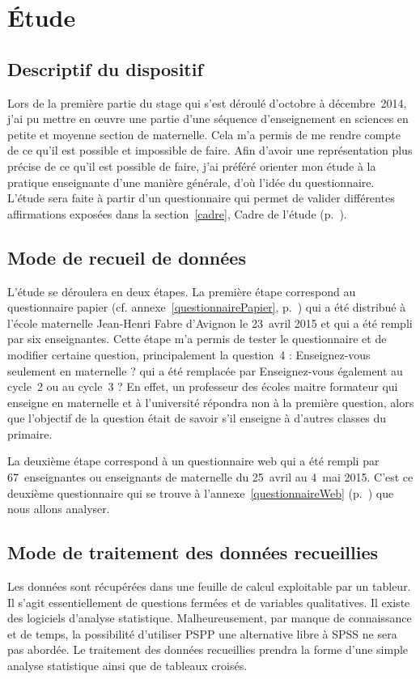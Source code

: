 \chapter{Étude}
\section{Descriptif du dispositif}
Lors de la première partie du stage qui s’est déroulé d’octobre à décembre~2014, j’ai pu mettre en œuvre une partie d’une séquence d’enseignement en sciences en petite et moyenne section de maternelle. Cela m’a permis de me rendre compte de ce qu’il est possible et impossible de faire. Afin d’avoir une représentation plus précise de ce qu’il est possible de faire, j’ai préféré orienter mon étude à la pratique enseignante d’une manière générale, d’où l’idée du questionnaire. L’étude sera faite à partir d’un questionnaire qui permet de valider différentes affirmations exposées dans la section~\ref{cadre}, \og Cadre de l’étude \fg{} (p.~\pageref{cadre}).

\section{Mode de recueil de données}
L’étude se déroulera en deux étapes. La première étape correspond au questionnaire papier (cf. annexe~\ref{questionnairePapier}, p.~\pageref{questionnairePapier}) qui a été distribué à l’école maternelle Jean-Henri Fabre d’Avignon le 23~avril 2015 et qui a été rempli par six enseignantes. Cette étape m’a permis de tester le questionnaire et de modifier certaine question, principalement la question~4 : \og Enseignez-vous seulement en maternelle ? \fg{} qui a été remplacée par \og Enseignez-vous également au cycle~2 ou au cycle~3 ? \fg{} En effet, un professeur des écoles maitre formateur qui enseigne en maternelle et à l’université répondra \og non \fg{} à la première question, alors que l’objectif de la question était de savoir s’il enseigne à d’autres classes du primaire.

La deuxième étape correspond à un questionnaire web qui a été rempli par 67~enseignantes ou enseignants de maternelle du 25~avril au 4~mai 2015. C’est ce deuxième questionnaire qui se trouve à l’annexe~\ref{questionnaireWeb} (p.~\pageref{questionnaireWeb}) que nous allons analyser.

\section{Mode de traitement des données recueillies}
Les données sont récupérées dans une feuille de calcul exploitable par un tableur. Il s’agit essentiellement de questions fermées et de variables qualitatives. Il existe des logiciels d'analyse statistique. Malheureusement, par manque de connaissance et de temps, la possibilité d’utiliser PSPP une alternative libre à SPSS ne sera pas abordée. Le traitement des données recueillies prendra la forme d’une simple analyse statistique ainsi que de tableaux croisés.